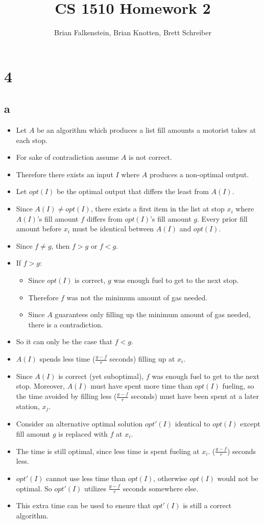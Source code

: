 \documentclass[letterpaper,notitlepage,twoside]{article}
\title{CS 1510 Homework 2}
\author{Brian Falkenstein, Brian Knotten, Brett Schreiber}
\begin{document}
\maketitle

\section*{4}
\subsection*{a}
\begin{itemize}
	\item Let $A$ be an algorithm which produces a list fill amounts a motorist takes at each stop. 
	\item For sake of contradiction assume $A$ is not correct.
	\item Therefore there exists an input $I$ where $A$ produces a non-optimal output.
	\item Let $opt(I)$ be the optimal output that differs the least from $A(I)$.
	\item Since $A(I) \neq opt(I)$, there exists a first item in the list at stop $x_i$ where $A(I)$'s fill amount $f$ differs from $opt(I)$'s fill amount $g$. Every prior fill amount before $x_i$ must be identical between $A(I)$ and $opt(I)$.
	\item Since $f \neq g$, then $f > g$ or $f < g$.
	\item If $f > g$:
	\begin{itemize}
		\item Since $opt(I)$ is correct, $g$ was enough fuel to get to the next stop.
		\item Therefore $f$ was not the minimum amount of gas needed.
		\item Since $A$ guarantees only filling up the minimum amount of gas needed, there is a contradiction.
	\end{itemize}
	
	\item So it can only be the case that $f < g$.
	\item $A(I)$ spends less time ($\frac{g - f}{r}$ seconds) filling up at $x_i$.
	\item Since $A(I)$ is correct (yet suboptimal), $f$ was enough fuel to get to the next stop. Moreover, $A(I)$ must have spent more time than $opt(I)$ fueling, so the time avoided by filling less ($\frac{g - f}{r}$ seconds) must have been spent at a later station, $x_j$.
	
	\item Consider an alternative optimal solution $opt'(I)$ identical to $opt(I)$ except fill amount $g$ is replaced with $f$ at $x_i$.
	\item The time is still optimal, since less time is spent fueling at $x_i$. ($\frac{g - f}{r}$) seconds less.
	\item $opt'(I)$ cannot use less time than $opt(I)$, otherwise $opt(I)$ would not be optimal. So $opt'(I)$ utilizes $\frac{g - f}{r}$ seconds somewhere else.

	\item This extra time can be used to ensure that $opt'(I)$ is still a correct algorithm.
\end{itemize}
\end{document}
